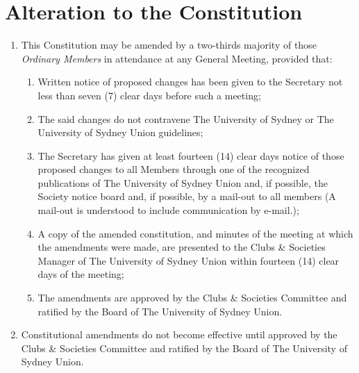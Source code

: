 \documentclass[11pt]{article}
\begin{document}
\section{Alteration to the Constitution}
\begin{enumerate}[\thesection .1]
    \item This Constitution may be amended by a two-thirds majority of those \textit{Ordinary Members} in attendance at any General Meeting, provided that:
    \begin{enumerate}[\hspace{5mm}1.]
        \item Written notice of proposed changes has been given to the Secretary not less than seven (7) clear days before such a meeting;
        \item The said changes do not contravene The University of Sydney or The University of Sydney Union guidelines;
        \item The Secretary has given at least fourteen (14) clear days notice of those proposed changes to all Members through one of the recognized publications of The University of Sydney Union and, if possible, the Society notice board and, if possible, by a mail-out to all members (A mail-out is understood to include communication by e-mail.);
        \item A copy of the amended constitution, and minutes of the meeting at which the amendments were made, are presented to the Clubs \& Societies Manager of The University of Sydney Union within fourteen (14) clear days of the meeting;
        \item The amendments are approved by the Clubs \& Societies Committee and ratified by the Board of The University of Sydney Union.
    \end{enumerate}
    \item Constitutional amendments do not become effective until approved by the Clubs \& Societies Committee and ratified by the Board of The University of Sydney Union.
\end{enumerate}
\end{document}
